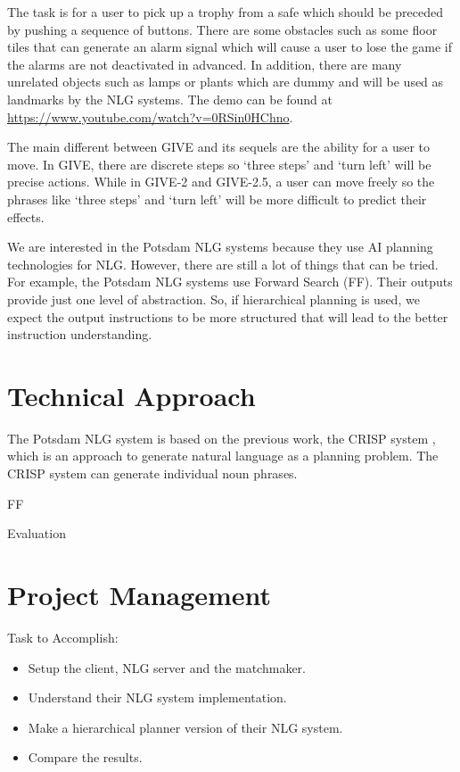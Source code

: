 \documentclass[11pt]{article} %
\begin{document}
The task is for a user to pick up a trophy from a safe which should be preceded
by pushing a sequence of buttons.
There are some obstacles such as some floor tiles that can generate an alarm signal
which will cause a user to lose the game if the alarms are not deactivated in advanced.
In addition, there are many unrelated objects such as lamps or plants which are dummy
and will be used as landmarks by the NLG systems.
The demo can be found at \url{https://www.youtube.com/watch?v=0RSin0HChno}.

The main different between GIVE and its sequels are the ability for a user to move.
In GIVE, there are discrete steps so `three steps' and `turn left' will be precise actions.
While in GIVE-2 and GIVE-2.5, a user can move freely so the phrases like `three steps'
and `turn left' will be more difficult to predict their effects.

We are interested in the Potsdam NLG systems \cite{garoufi2011potsdam} because they use AI planning
technologies for NLG.
However, there are still a lot of things that can be tried.
For example, the Potsdam NLG systems use Forward Search (FF).
Their outputs provide just one level of abstraction.
So, if hierarchical planning is used, we expect the output instructions to be more structured
that will lead to the better instruction understanding.

\section{Technical Approach}

The Potsdam NLG system \cite{garoufi2011combining, garoufi2011potsdam, garoufi2014generation}
is based on the previous work, the CRISP system \cite{crisp07}, which is an approach to
generate natural language as a planning problem.
The CRISP system can generate individual noun phrases. 

FF

Evaluation

\section{Project Management}

Task to Accomplish:
\begin{itemize}
  \item Setup the client, NLG server and the matchmaker.
  \item Understand their NLG system implementation.
  \item Make a hierarchical planner version of their NLG system.
  \item Compare the results.
\end{itemize}
\end{document}
